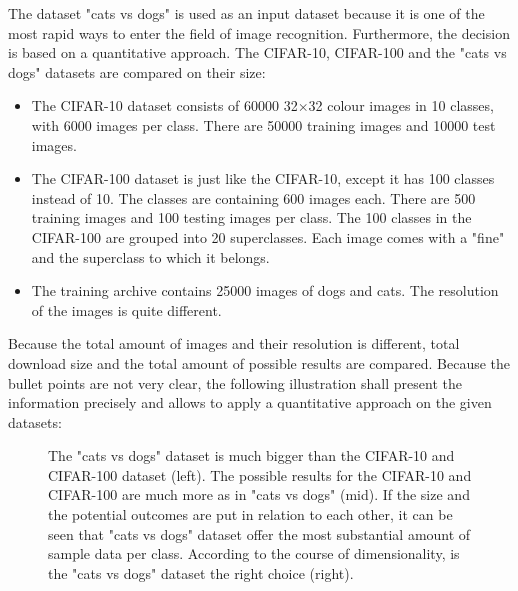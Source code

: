 The dataset "cats vs dogs" is used as an input dataset because it is one of the most rapid ways to enter the field of image recognition. Furthermore, the decision is based on a quantitative approach. The CIFAR-10, CIFAR-100 and the "cats vs dogs"  datasets are compared on their size:

\begin{itemize}
	\item The CIFAR-10 dataset consists of 60000 32\(\times\)32 colour images in 10 classes, with 6000 images per class. There are 50000 training images and 10000 test images.
	\item The CIFAR-100 dataset is just like the CIFAR-10, except it has 100 classes instead of 10. The classes are containing 600 images each. There are 500 training images and 100 testing images per class. The 100 classes in the CIFAR-100 are grouped into 20 superclasses. Each image comes with a "fine"  and the superclass to which it belongs.
	\item The training archive contains 25000 images of dogs and cats. The resolution of the images is quite different.
\end{itemize}

Because the total amount of images and their resolution is different, total download size and the total amount of possible results are compared. Because the bullet points are not very clear, the following illustration shall present the information precisely and allows to apply a quantitative approach on the given datasets: 

\begin{figure}[htp]
	\centering
	\caption{The "cats vs dogs" dataset is much bigger than the CIFAR-10 and CIFAR-100 dataset  (left). The possible results for the CIFAR-10 and CIFAR-100 are much more as in "cats vs dogs" (mid). If the size and the potential outcomes are put in relation to each other, it can be seen that "cats vs dogs" dataset offer the most substantial amount of sample data per class. According to the course of dimensionality, is the "cats vs dogs" dataset the right choice (right).}
	\label{fig:47_data-set-quantative}
\end{figure}

